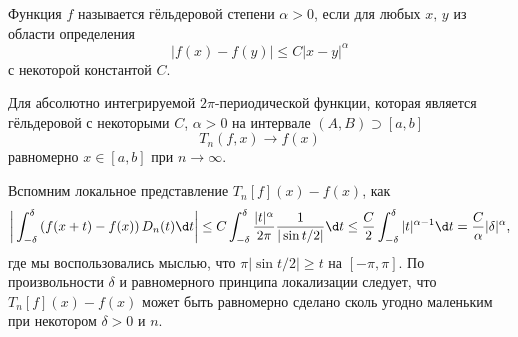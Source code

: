 
\begin{to_def}
    Функция $f$ называется гёльдеровой степени $\alpha > 0$, если для любых $x, \, y$ из области определения
    \begin{equation*}
        |f(x) -f(y)| \leq C |x-y|^{\alpha}
    \end{equation*}
    с некоторой константой $C$.
\end{to_def}


\begin{to_thr}
    Для абсолютно интегрируемой $2\pi$-периодической функции, которая является гёльдеровой с некоторыми $C$, $\alpha > 0$ на интервале $(A, B) \supset [a, b]$
    \begin{equation*}
        T_n (f, x) \to f(x)
    \end{equation*}
    равномерно $x \in [a, b]$ при $n \to \infty$.
\end{to_thr}

\begin{uproof}
    Вспомним локальное представление $T_n[f](x) - f(x)$, как
    \begin{equation*}
        \bigg|
            \int_{-\delta}^{\delta} \left(f(x+t)-f(x)\right) D_n (t) \d t
        \bigg|  \leq 
        C \int_{-\delta}^{\delta} \frac{|t|^\alpha}{2\pi}
        \frac{1}{|\sin t/2|} \d t \leq 
        \frac{C}{2} \int_{-\delta}^{\delta} |t|^{\alpha-1} \d t = \frac{C}{\alpha} |\delta|^\alpha,
    \end{equation*}
    где мы воспользовались мыслью, что $\pi |\sin t/2| \geq t$ на $[-\pi, \pi]$. По произвольности $\delta$ и равномерного принципа локализации следует, что $T_n[f](x) - f(x)$ может быть равномерно сделано сколь угодно маленьким при некотором $\delta > 0$ и $n$. 
\end{uproof}